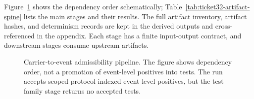 \documentclass[11pt]{article}
\theoremstyle{definition}
\begin{document}
Figure~\ref{fig:carrier-to-event-pipeline} shows the dependency order schematically; Table~\ref{tab:ticket32-artifact-spine} lists the main stages and their results. The full artifact inventory, artifact hashes, and determinism records are kept in the derived outputs and cross-referenced in the appendix. Each stage has a finite input-output contract, and downstream stages consume upstream artifacts.

\begin{figure}[t]
\centering
{}
\caption{Carrier-to-event admissibility pipeline. The figure shows dependency order, not a promotion of event-level positives into tests. The run accepts scoped protocol-indexed event-level positives, but the test-family stage returns no accepted tests.}
\label{fig:carrier-to-event-pipeline}
\end{figure}
\end{document}

